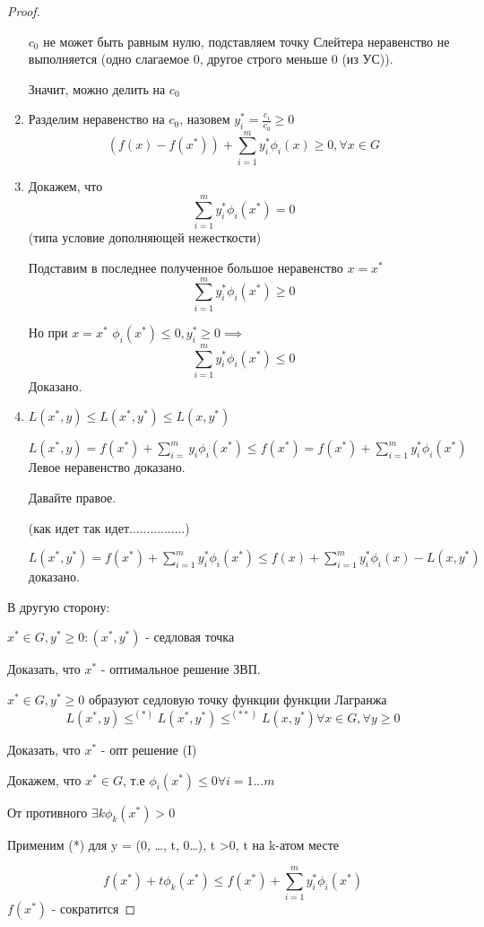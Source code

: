 \documentclass[a4paper]{article}
\theoremstyle{definition}
\theoremstyle{remark}
\begin{document}
\begin{proof}
\begin{enumerate}
        $c_0$ не может быть равным нулю, подставляем точку Слейтера неравенство не выполняется (одно слагаемое 0, другое строго меньше 0 (из УС)).

        Значит, можно делить на $c_0$
        \item Разделим неравенство на $c_0$, назовем $y_i^* = \frac{c_i}{c_0}\ge 0$
        \[(f(x) - f(x^*)) + \sum_{i = 1}^m y_i^* \phi_i(x)\ge 0, \forall x\in G\]
        \item Докажем, что 
        \[\sum_{i = 1}^m y_i^* \phi_i(x^*) = 0\]
        (типа условие дополняющей нежесткости)

        Подставим в последнее полученное большое неравенство $x = x^*$
        \[\sum_{i = 1}^m y_i^* \phi_i(x^*)\ge 0\]

        Но при $x = x^*$ $\phi_i(x^*)\le 0, y_i^*\ge 0\implies$
        \[ \sum_{i = 1}^m y_i^* \phi_i(x^*)\le 0\]
        Доказано.
        \item $L(x^*, y)\le L(x^*, y^*)\le L(x, y^*)$

        $L(x^*, y) = f(x^*) +\sum_{i = }^{m} y_i \phi_i(x^*)\le f(x^*) = f(x^*) + \sum_{i = 1}^m y_i^* \phi_i(x^*)$ Левое неравенство доказано.

        Давайте правое.

        (как идет так идет................)

        $L(x^*, y^*) = f(x^*) +\sum_{i = 1}^{m}y_i^* \phi_i(x^*)\le f(x) +\sum_{i =1 }^{m} y_i^* \phi_i(x) - L(x, y^*)$
        доказано.


    \end{enumerate}        
    В другую сторону:

    $x^* \in G, y^* \ge 0: (x^*, y^*)$ - седловая точка

    Доказать, что $x^*$ - оптимальное решение ЗВП.

    $x^*\in G, y^* \ge 0$ образуют седловую точку функции функции Лагранжа \[L(x^*, y)\le^{(*)} L(x^*, y^*)\le^(**) L(x, y^*) \forall x\in G, \forall y \ge0\]

    Доказать, что $x^*$ - опт решение (I) 
    
    Докажем, что $x^* \in G$, т.е $\phi_i(x^*)\le 0 \forall i = 1\dots m$

    От противного $\exists k \phi_k(x^*)>0$

    Применим  (*)  для y = (0, \dots, t, 0\dots), t >0, t на k-атом месте

    \[f(x^*) + t \phi_k(x^*) \le f(x^*)+\sum_{i = 1}^m y_i^* \phi_i(x^*)\]
    $f(x^*)$ - сократится 


\end{proof}
\end{document}
